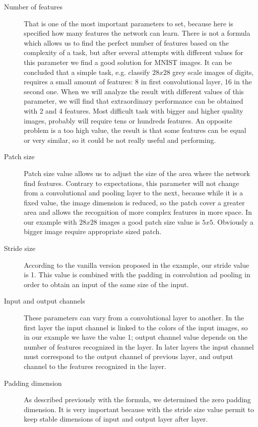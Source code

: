 \begin{description}
	
	\item[Number of features] That is one of the most important parameters to set, because here is specified how many features the network can learn. There is not a formula which allows us to find the perfect number of features based on the complexity of a task, but after several attempts with different values for this parameter we find a good solution for MNIST images. It can be concluded that a simple task, e.g. classify $28x28$ grey scale images of digits, requires a small amount of features: 8 in first convolutional layer, 16 in the second one. When we will analyze the result with different values of this parameter, we will find that extraordinary performance can be obtained with 2 and 4 features. Most difficult task with bigger and higher quality images, probably will require tens or hundreds features. An opposite problem is a too high value, the result is that some features can be equal or very similar, so it could be not really useful and performing.

	\item[Patch size] Patch size value allows us to adjust the size of the area where the network find features. Contrary to expectations, this parameter will not change from a convolutional and pooling layer to the next, because while it is a fixed value, the image dimension is reduced, so the patch cover a greater area and allows the recognition of more complex features in more space.  In our example with $28x28$ images a good patch size value is $5x5$. Obviously a bigger image require appropriate sized patch.
	
	\item[Stride size] According to the vanilla version proposed in the example, our stride value is 1. This value is combined with the padding in convolution ad pooling in order to obtain an input of the same size of the input.
	
	\item[Input and output channels] These parameters can vary from a convolutional layer to another. In the first layer the input channel is linked to the colors of the input images, so in our example we have the value 1; output channel value depends on the number of features recognized in the layer. In later layers the input channel must correspond to the output channel of previous layer, and output channel to the features recognized in the layer.
	
	\item[Padding dimension] As described previously with the formula, we determined the zero padding dimension. It is very important because with the stride size value permit to keep stable dimensions of input and output layer after layer.

\end{description}

